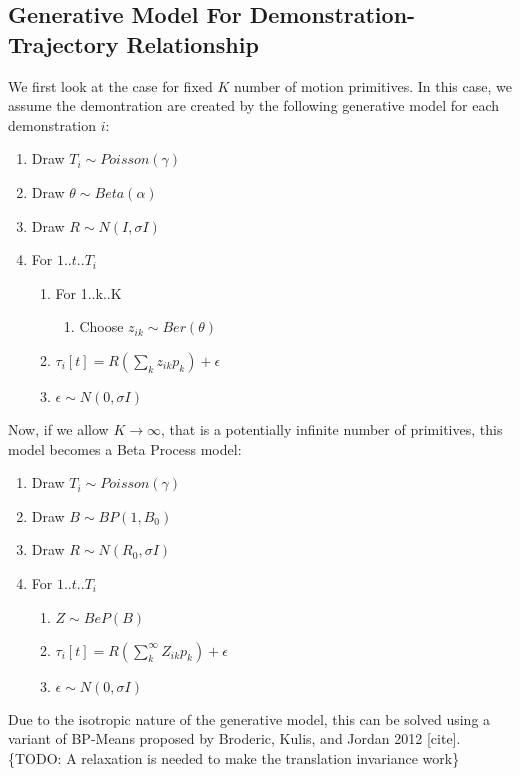 \subsection{Generative Model For Demonstration-Trajectory Relationship}
We first look at the case for fixed $K$ number of motion primitives.
In this case, we assume the demontration are created by the following
generative model for each demonstration $i$:
\begin{enumerate}
\item Draw $T_{i}\sim Poisson(\gamma)$
\item Draw $\theta\sim Beta(\alpha)$
\item Draw $R\sim N(I,\sigma I)$
\item For $1..t..T_{i}$

\begin{enumerate}
\item For 1..k..K

\begin{enumerate}
\item Choose $z_{ik}\sim Ber(\theta)$ 
\end{enumerate}
\item $\tau_{i}[t]=R(\sum_{k}z_{ik}p_{k})+\epsilon$
\item $\epsilon\sim N(0,\sigma I)$
\end{enumerate}
\end{enumerate}
Now, if we allow $K\rightarrow\infty$, that is a potentially infinite
number of primitives, this model becomes a Beta Process model:
\begin{enumerate}
\item Draw $T_{i}\sim Poisson(\gamma)$
\item Draw $B\sim BP(1,B_{0})$
\item Draw $R\sim N(R_{0},\sigma I)$
\item For $1..t..T_{i}$

\begin{enumerate}
\item $Z\sim BeP(B)$ 
\item $\tau_{i}[t]=R(\sum_{k}^{\infty}Z_{ik}p_{k})+\epsilon$ 
\item $\epsilon\sim N(0,\sigma I)$
\end{enumerate}
\end{enumerate}
Due to the isotropic nature of the generative model, this can be solved
using a variant of BP-Means proposed by Broderic, Kulis, and Jordan
2012 {[}cite{]}. \{TODO: A relaxation is needed to make the translation
invariance work\}


